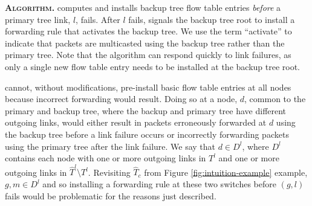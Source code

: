 

{\bf \pre \textsc{Algorithm.}}
\pre computes and installs backup tree flow table entries \emph{before} a primary tree link, $l$, fails.  After $l$ fails, \pre signals the backup tree root
to install a forwarding rule that activates the backup tree.  We use the term ``activate'' to indicate that packets are multicasted using the backup tree rather than the primary tree.
Note that the \pre algorithm can respond quickly to link failures, as only a single new flow table entry needs to be installed at the backup tree root.


\pre cannot, without modifications, pre-install basic flow table entries at all nodes because incorrect forwarding would result. Doing so at a node, $d$, common to the primary and backup tree,
where the backup and primary tree have different outgoing links, would either result in packets erroneously forwarded at $d$ using the backup tree before a link failure occurs or 
incorrectly forwarding packets using the primary tree after the link failure. 
We say that $d \in D^l$, where $D^l$ contains each node with one or more outgoing links in $T^l$ and one or more outgoing links in $\hat{T}^l \setminus T^l$.
Revisiting $\hat{T}_c$ from Figure \ref{fig:intuition-example} example, $g,m \in D^l$ and so installing a forwarding rule at these two switches before $(g,l)$ fails 
would be problematic for the reasons just described.



